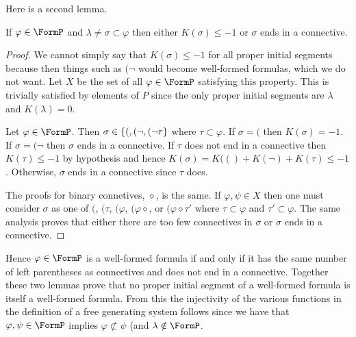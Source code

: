 \documentclass[10pt]{article}
\begin{document}
\begin{enumerate}
Here is a second lemma.
\begin{lemma}
If $\varphi \in \FormP$ and $\lambda \neq \sigma \subset \varphi$ then either $K(\sigma) \leq -1$ or $\sigma$ ends in a connective.
\end{lemma}
\begin{proof}
We cannot simply say that $K(\sigma) \leq -1$ for all proper initial segments because then things such as $(\neg$ would become well-formed formulas, which we do not want.  Let $X$ be the set of all $\varphi \in \FormP$ satisfying this property.  This is trivially satisfied by elements of $P$ since the only proper initial segments are $\lambda$ and $K(\lambda) = 0$.

Let $\varphi \in \FormP$.  Then $\sigma \in \left\{ (, (\neg, (\neg\tau \right\}$ where $\tau \subset \varphi$.  If $\sigma = ($ then $K(\sigma) = -1$.  If $\sigma = (\neg$ then $\sigma$ ends in a connective.  If $\tau$ does not end in a connective then $K(\tau) \leq -1$ by hypothesis and hence $K(\sigma) = K(() + K(\neg) + K(\tau) \leq -1$.  Otherwise, $\sigma$ ends in a connective since $\tau$ does.

The proofs for binary connetives, $\diamond$, is the same.  If $\varphi, \psi \in X$ then one must consider $\sigma$ as one of $($, $(\tau$, $(\varphi$, $(\varphi\diamond$, or $(\varphi\diamond\tau'$ where $\tau \subset \varphi$ and $\tau' \subset \varphi$.  The same analysis proves that either there are too few connectives in $\sigma$ or $\sigma$ ends in a connective.
\end{proof}

Hence $\varphi \in \FormP$ is a well-formed formula if and only if it has the same number of left parentheses as connectives and does not end in a connective.  Together these two lemmas prove that no proper initial segment of a well-formed formula is itself a well-formed formula.  From this the injectivity of the various functions in the definition of a free generating system follows since we have that $\varphi, \psi \in \FormP$ implies $\varphi \not\subset \psi$ (and $\lambda \notin \FormP$.


\end{enumerate}
\end{document}
